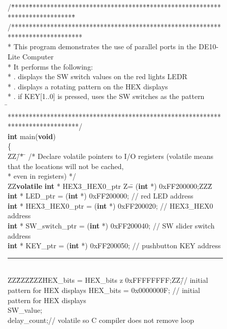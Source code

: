 \begin{figure}[h!]
\begin{center}
\begin{minipage}[t]{12.5 cm}
\begin{tabbing}
/\=*****\=*********************************\=****************************************\=\kill
/********************************************************************************\\
\>* This program demonstrates the use of parallel ports in the DE10-Lite Computer\\
\>* It performs the following: \\
\>* . displays the SW switch values on the red lights LEDR\\
\>* . displays a rotating pattern on the HEX displays\\
\>* . if KEY[1..0] is pressed, uses the SW switches as the pattern\\
\=\kill
\>********************************************************************************/\\
{\bf int} main({\bf void})\\
\{\\
ZZ\=/\=* \=\kill
\>/* Declare volatile pointers to I/O registers (volatile means that the locations will
not be cached,\\
\>\>* even in registers) */\\
ZZ\={\bf volatile} {\bf int} * HEX3\_HEX0\_ptr	Z\== ({\bf int} *) 0xFF200000;ZZZ\=\kill
{} {\bf int} * LED\_ptr \>= ({\bf int} *) 0xFF200000; \>// red LED address\\
 {\bf int} * HEX3\_HEX0\_ptr	\>= ({\bf int} *) 0xFF200020; \>// HEX3\_HEX0 address\\
 {\bf int} * SW\_switch\_ptr	\>= ({\bf int} *) 0xFF200040; \>// SW slider switch address\\
 {\bf int} * KEY\_ptr \>= ({\bf int} *) 0xFF200050;	\>// pushbutton KEY address\\
\rule{6.0in}{0in}~\\
ZZ\=ZZZ\=ZZZ\=HEX\_bits = HEX\_bits z 0xFFFFFFFF;ZZ\=// initial pattern for HEX displays\kill
{} HEX\_bits = 0x0000000F; \>\>\>// initial pattern for HEX displays\\
 SW\_value;\\
 delay\_count;\>\>\>// volatile so C compiler does not remove loop\\
~\\

\end{tabbing}
\end{minipage}
\end{center}
\end{figure}
